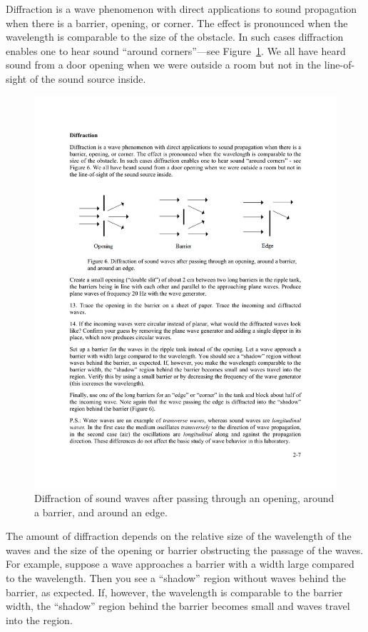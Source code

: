 \documentclass[11pt]{NSF}
\begin{document}
Diffraction is a wave phenomenon with direct applications to sound propagation
when there is a barrier, opening, or corner. The effect is pronounced when the
wavelength is comparable to the size of the obstacle. In such cases diffraction
enables one to hear sound ``around corners”---see Figure~\ref{f:7}. 
We all have heard
sound from a door opening when we were outside a room but not in the
line-of-sight of the sound source inside.
%
\begin{figure}[hbtp]
\begin{center}
\includegraphics[width=.95\textwidth]{fig2_7}
\caption{Diffraction of sound waves after passing through an opening, 
around a barrier, and around an edge.}
\label{f:7}
\end{center}
\end{figure}
%

The amount of diffraction depends on the relative size of the wavelength
of the waves and the size of the opening or barrier obstructing the 
passage of the waves.
For example, suppose a wave approaches a barrier with a width large
compared to the wavelength.
Then you see a ``shadow” region without waves behind the barrier, 
as expected. 
If, however, the wavelength is comparable to the barrier width, the 
``shadow” region behind the barrier becomes small and waves travel into the region.
\end{document}

